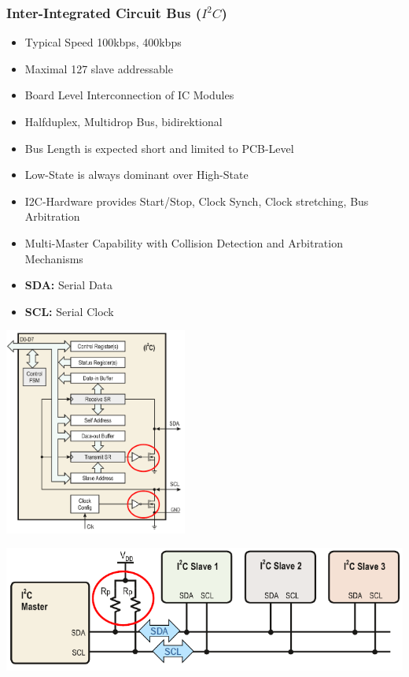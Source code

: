 \subsubsection{Inter-Integrated Circuit Bus ($I^2C$)}
\begin{minipage}{13cm}
	\begin{itemize}
		\item Typical Speed 100kbps, 400kbps
		\item Maximal 127 slave addressable
		\item Board Level Interconnection of IC Modules
		\item Halfduplex, Multidrop Bus, bidirektional
		\item Bus Length is expected short and limited to PCB-Level
		\item Low-State is always dominant over High-State
		\item I2C-Hardware provides Start/Stop, Clock Synch, Clock stretching, Bus Arbitration
		\item Multi-Master Capability with Collision Detection and Arbitration Mechanisms
		\item \textbf{SDA: }Serial Data
		\item \textbf{SCL: }Serial Clock
	\end{itemize}
\end{minipage}
\begin{minipage}{6cm}
	\includegraphics[width=6cm]{images/i2c_internal.png}
\end{minipage}
\includegraphics[width=14cm]{images/i2c_1.png}\\
